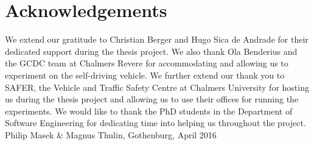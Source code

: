 \thispagestyle{plain}			%
\section*{Acknowledgements}
We extend our gratitude to Christian Berger and Hugo Sica de Andrade for their dedicated support during the thesis project. We also thank Ola Benderius and the GCDC team at Chalmers Revere for accommodating and allowing us to experiment on the self-driving vehicle. We further extend our thank you to SAFER, the Vehicle and Traffic Safety Centre at Chalmers University for hosting us during the thesis project and allowing us to use their offices for running the experiments. We would like to thank the PhD students in the Department of Software Engineering for dedicating time into helping us throughout the project.\newline \newline \newline
\vspace{1.5cm}
\hfill
Philip Masek \& Magnus Thulin, Gothenburg, April 2016 \\

\newpage				%
\thispagestyle{empty}
\mbox{}